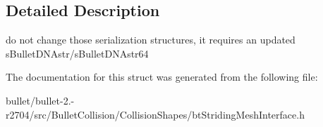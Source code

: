 \subsection{Detailed Description}
do not change those serialization structures, it requires an updated s\+Bullet\+D\+N\+Astr/s\+Bullet\+D\+N\+Astr64 

The documentation for this struct was generated from the following file\+:\begin{DoxyCompactItemize}
\item 
bullet/bullet-\/2.-\/r2704/src/\+Bullet\+Collision/\+Collision\+Shapes/bt\+Striding\+Mesh\+Interface.\+h\end{DoxyCompactItemize}
